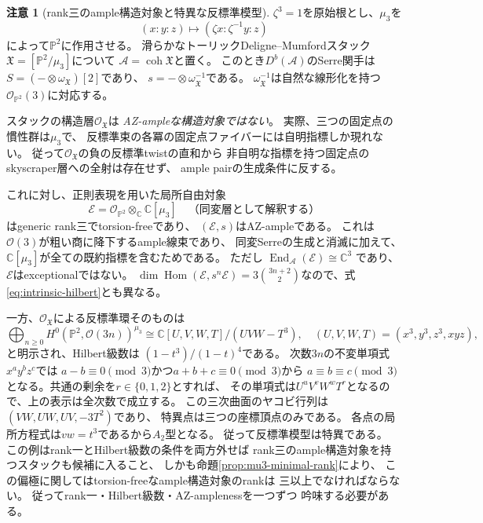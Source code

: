 \documentclass[11pt,a4paper]{ltjsarticle}
\theoremstyle{definition}
\newtheorem{remark}[theorem]{注意}
\begin{document}
\begin{remark}[rank三のample構造対象と特異な反標準模型]
\label{rem:mu3-stack}
$\zeta^3=1$を原始根とし、$\mu_3$を
\[
 (x:y:z)\longmapsto(\zeta x:\zeta^{-1}y:z)
\]
によって$\mathbb P^2$に作用させる。
滑らかなトーリックDeligne--Mumfordスタック
$\mathfrak X=[\mathbb P^2/\mu_3]$について
$\mathcal A=\operatorname{coh}\mathfrak X$と置く。
このとき$D^b(\mathcal A)$のSerre関手は
$S=(-\otimes\omega_{\mathfrak X})[2]$であり、
$s=-\otimes\omega_{\mathfrak X}^{-1}$である。
$\omega_{\mathfrak X}^{-1}$は自然な線形化を持つ
$\mathcal O_{\mathbb P^2}(3)$に対応する。

スタックの構造層$\mathcal O_{\mathfrak X}$は
\emph{AZ-ampleな構造対象ではない}。
実際、三つの固定点の慣性群は$\mu_3$で、
反標準束の各冪の固定点ファイバーには自明指標しか現れない。
従って$\mathcal O_{\mathfrak X}$の負の反標準twistの直和から
非自明な指標を持つ固定点のskyscraper層への全射は存在せず、
ample pairの生成条件に反する。

これに対し、正則表現を用いた局所自由対象
\[
 \mathcal E=\mathcal O_{\mathbb P^2}\otimes_{\mathbb C}
             \mathbb C[\mu_3]
 \quad\text{（同変層として解釈する）}
\]
はgeneric rank三でtorsion-freeであり、
$(\mathcal E,s)$はAZ-ampleである。
これは$\mathcal O(3)$が粗い商に降下するample線束であり、
同変Serreの生成と消滅に加えて、
$\mathbb C[\mu_3]$が全ての既約指標を含むためである。
ただし
$\operatorname{End}_{\mathcal A}(\mathcal E)\cong\mathbb C^3$
であり、$\mathcal E$はexceptionalではない。
$\dim\operatorname{Hom}(\mathcal E,s^n\mathcal E)
=3\binom{3n+2}{2}$なので、式\eqref{eq:intrinsic-hilbert}とも異なる。

一方、$\mathcal O_{\mathfrak X}$による反標準環そのものは
\[
 \bigoplus_{n\geq0}
 H^0(\mathbb P^2,\mathcal O(3n))^{\mu_3}
 \cong
 \mathbb C[U,V,W,T]/(UVW-T^3),
 \quad (U,V,W,T)=(x^3,y^3,z^3,xyz),
\]
と明示され、Hilbert級数は
$(1-t^3)/(1-t)^4$である。
次数$3n$の不変単項式$x^ay^bz^c$では
$a-b\equiv0\pmod3$かつ$a+b+c\equiv0\pmod3$から
$a\equiv b\equiv c\pmod3$となる。共通の剰余を$r\in\{0,1,2\}$とすれば、
その単項式は$U^uV^vW^wT^r$となるので、上の表示は全次数で成立する。
この三次曲面のヤコビ行列は$(VW,UW,UV,-3T^2)$であり、
特異点は三つの座標頂点のみである。
各点の局所方程式は$vw=t^3$であるから$A_2$型となる。
従って反標準模型は特異である。
この例はrank一とHilbert級数の条件を両方外せば
rank三のample構造対象を持つスタックも候補に入ること、
しかも命題\ref{prop:mu3-minimal-rank}により、
この偏極に関してはtorsion-freeなample構造対象のrankは
三以上でなければならない。
従ってrank一・Hilbert級数・AZ-amplenessを一つずつ
吟味する必要がある。
\end{remark}
\end{document}
